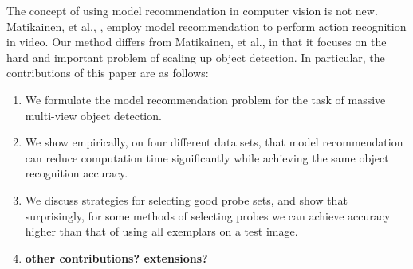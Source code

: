\documentclass{article} %
\begin{document}
The concept of using model recommendation in computer vision is not new. Matikainen, et al., \cite{matikainen2012model}, employ model recommendation to perform action recognition in video. Our method differs from Matikainen, et al., in that it focuses on the hard and important problem of scaling up object detection. In particular, the contributions of this paper are as follows: 
\begin{enumerate}
\item We formulate the model recommendation problem for the task of massive multi-view object detection.
\item We show empirically, on four different data sets, that model recommendation can reduce computation time significantly while achieving the same object recognition accuracy.
\item We discuss strategies for selecting good probe sets, and show that surprisingly, for some methods of selecting probes we can achieve accuracy higher than that of using all exemplars on a test image.
\item {\bf other contributions? extensions?}
\end{enumerate}


\end{document}
